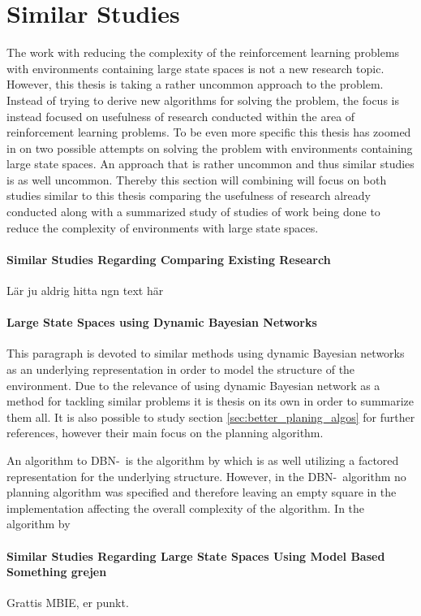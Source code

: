 \section{Similar Studies }
The work with reducing the complexity of the reinforcement learning problems with environments containing large state spaces is not a new research topic. However, this thesis is taking a rather uncommon approach to the problem. Instead of trying to derive new algorithms for solving the problem, the focus is instead focused on usefulness of research conducted within the area of reinforcement learning problems. To be even more specific this thesis has zoomed in on two possible attempts on solving the problem with environments containing large state spaces. An approach that is rather uncommon and thus similar studies is as well uncommon. Thereby this section will combining will focus on both studies similar to this thesis comparing the usefulness of research already conducted along with a summarized study of studies of work being done to reduce the complexity of environments with large state spaces.


\paragraph{Similar Studies Regarding Comparing Existing Research}
Lär ju aldrig hitta ngn text här

\paragraph{Large State Spaces using Dynamic Bayesian Networks}
This paragraph is devoted to similar methods using dynamic Bayesian networks as an underlying representation in order to model the structure of the environment. Due to the relevance of using dynamic Bayesian network as a method for tackling similar problems it is thesis on its own in order to summarize them all. It is also possible to study section \ref{sec:better_planing_algos} for further references, however their main focus on the planning algorithm.

An algorithm to DBN-\etre\ is the algorithm by \textcite{ross2012model} which is as well utilizing a factored representation for the underlying structure. However, in the DBN-\etre\ algorithm no planning algorithm was specified and therefore leaving an empty square in the implementation affecting the overall complexity of the algorithm. In the algorithm by \textcite{ross2012model} 


\paragraph{Similar Studies Regarding Large State Spaces Using Model Based Something grejen}
Grattis MBIE, er punkt.